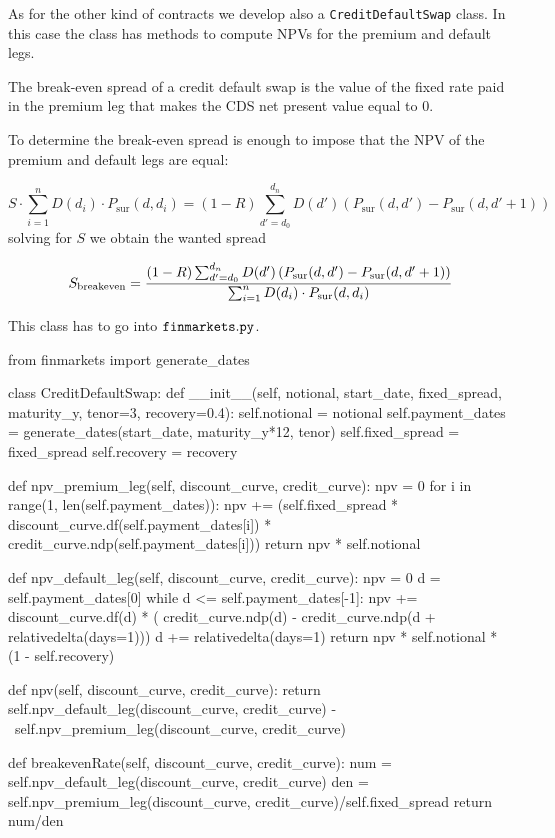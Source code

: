 \begin{finmarkets}
As for the other kind of contracts we develop also a \texttt{CreditDefaultSwap} class. In this case the class has methods to compute NPVs for the premium and default legs. 

The break-even spread of a credit default swap is the value of the fixed rate paid in the premium leg that makes the CDS net present value equal to 0.

To determine the break-even spread is enough to impose that the NPV of the premium and default legs are equal:

\begin{equation}
S \cdot\sum_{i=1}^{n} D(d_i) \cdot P_{\textrm{sur}}(d, d_i)
= (1-R) \sum_{d'=d_0}^{d_n} D(d') \left( P_{\textrm{sur}}(d, d') - P_{\textrm{sur}}(d, d'+1) \right)
\end{equation}
solving for $S$ we obtain the wanted spread

\begin{equation}
S_{\mathrm{breakeven}} = \cfrac{(1-R) \sum_{d'=d_0}^{d_n} D(d') \left( P_{\textrm{sur}}(d, d') - P_{\textrm{sur}}(d, d'+1) \right)}{\sum_{i=1}^{n} D(d_i) \cdot P_{\textrm{sur}}(d, d_i)}
\end{equation}

This class has to go into $\tt{finmarkets.py}$.
\end{finmarkets}

\begin{ipython}
from finmarkets import generate_dates

class CreditDefaultSwap:
    def __init__(self, notional, start_date, fixed_spread,
                 maturity_y, tenor=3, recovery=0.4):
        self.notional = notional
        self.payment_dates = generate_dates(start_date,
                                            maturity_y*12, tenor)
        self.fixed_spread = fixed_spread
        self.recovery = recovery

    def npv_premium_leg(self, discount_curve, credit_curve):
        npv = 0
        for i in range(1, len(self.payment_dates)):
            npv += (self.fixed_spread *
                    discount_curve.df(self.payment_dates[i]) *
                    credit_curve.ndp(self.payment_dates[i]))
        return npv * self.notional

    def npv_default_leg(self, discount_curve, credit_curve):
        npv = 0
        d = self.payment_dates[0]
        while d <= self.payment_dates[-1]:
            npv += discount_curve.df(d) * (
                   credit_curve.ndp(d) -
                   credit_curve.ndp(d + relativedelta(days=1)))
            d += relativedelta(days=1)
        return npv * self.notional * (1 - self.recovery)

    def npv(self, discount_curve, credit_curve):
        return self.npv_default_leg(discount_curve, credit_curve) - \
               self.npv_premium_leg(discount_curve, credit_curve)

    def breakevenRate(self, discount_curve, credit_curve):
        num = self.npv_default_leg(discount_curve, credit_curve)
        den = self.npv_premium_leg(discount_curve, credit_curve)/self.fixed_spread
        return num/den
\end{ipython}

